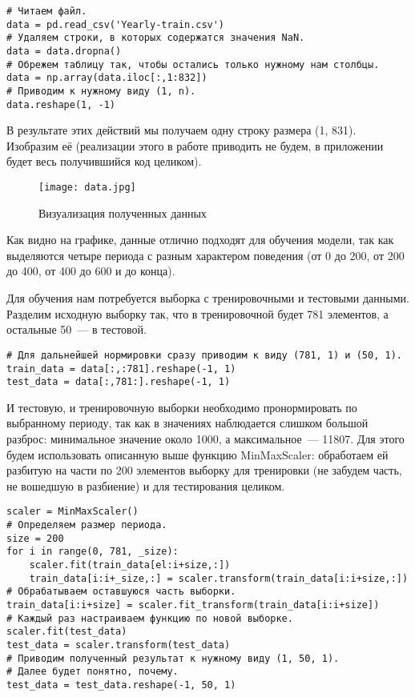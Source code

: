\documentclass[12pt, a4paper]{article}
\begin{document}
\begin{verbatim}
# Читаем файл.
data = pd.read_csv('Yearly-train.csv')
# Удаляем строки, в которых содержатся значения NaN.
data = data.dropna()
# Обрежем таблицу так, чтобы остались только нужному нам столбцы.
data = np.array(data.iloc[:,1:832])
# Приводим к нужному виду (1, n).
data.reshape(1, -1)
\end{verbatim}

В результате этих действий мы получаем одну строку размера (1, 831). Изобразим её (реализации этого в работе приводить не будем, в приложении будет весь получившийся код целиком).

\begin{figure}[ht]
	\centering
	\texttt{[image: data.jpg]}
	\caption{Визуализация полученных данных}
\end{figure}

Как видно на графике, данные отлично подходят для обучения модели, так как выделяются четыре периода с разным характером поведения (от 0 до 200, от 200 до 400, от 400 до 600 и до конца).

Для обучения нам потребуется выборка с тренировочными и тестовыми данными. Разделим исходную выборку так, что в тренировочной будет 781 элементов, а остальные 50~--- в тестовой.

\begin{verbatim}
# Для дальнейшей нормировки сразу приводим к виду (781, 1) и (50, 1).
train_data = data[:,:781].reshape(-1, 1)
test_data = data[:,781:].reshape(-1, 1)
\end{verbatim}

И тестовую, и тренировочную выборки необходимо пронормировать по выбранному периоду, так как в значениях наблюдается слишком большой разброс: минимальное значение около 1000, а максимальное~--- 11807. Для этого будем использовать описанную выше функцию MinMaxScaler: обработаем ей разбитую на части по 200 элементов выборку для тренировки (не забудем часть, не вошедшую в разбиение) и для тестирования целиком.

\begin{verbatim}
scaler = MinMaxScaler()
# Определяем размер периода.
size = 200
for i in range(0, 781, _size):
	scaler.fit(train_data[el:i+size,:])
    train_data[i:i+_size,:] = scaler.transform(train_data[i:i+size,:])
# Обрабатываем оставшуюся часть выборки.
train_data[i:i+size] = scaler.fit_transform(train_data[i:i+size])
# Каждый раз настраиваем функцию по новой выборке.
scaler.fit(test_data)
test_data = scaler.transform(test_data)
# Приводим полученный результат к нужному виду (1, 50, 1).
# Далее будет понятно, почему.
test_data = test_data.reshape(-1, 50, 1)
\end{verbatim}
\end{document}
